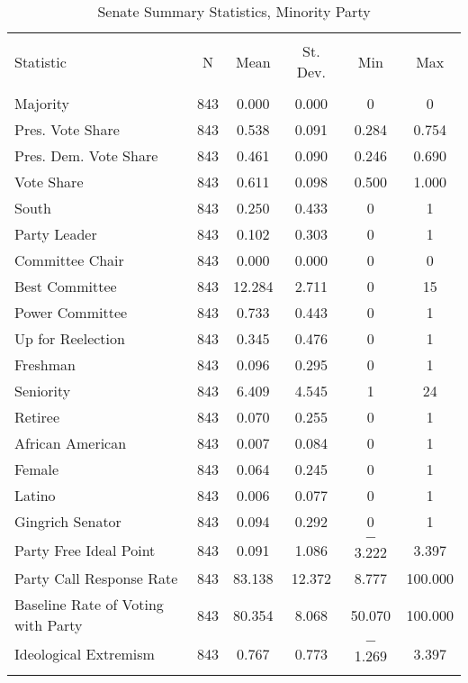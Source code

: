 \documentclass[12pt]{article}
\begin{document}
\begin{table}[!htbp] \centering 
	\caption{Senate Summary Statistics, Minority Party } 
	\label{} 
	\begin{tabular}{@{\extracolsep{5pt}}lccccc} 
		\\[-1.8ex]\hline 
		\hline \\[-1.8ex] 
		Statistic & \multicolumn{1}{c}{N} & \multicolumn{1}{c}{Mean} & \multicolumn{1}{c}{St. Dev.} & \multicolumn{1}{c}{Min} & \multicolumn{1}{c}{Max} \\ 
		\hline \\[-1.8ex] 
		Majority & 843 & 0.000 & 0.000 & 0 & 0 \\ 
		Pres. Vote Share & 843 & 0.538 & 0.091 & 0.284 & 0.754 \\ 
		Pres. Dem. Vote Share & 843 & 0.461 & 0.090 & 0.246 & 0.690 \\ 
		Vote Share & 843 & 0.611 & 0.098 & 0.500 & 1.000 \\ 
		South & 843 & 0.250 & 0.433 & 0 & 1 \\ 
		Party Leader & 843 & 0.102 & 0.303 & 0 & 1 \\ 
		Committee Chair & 843 & 0.000 & 0.000 & 0 & 0 \\ 
		Best Committee & 843 & 12.284 & 2.711 & 0 & 15 \\ 
		Power Committee & 843 & 0.733 & 0.443 & 0 & 1 \\ 
		Up for Reelection & 843 & 0.345 & 0.476 & 0 & 1 \\ 
		Freshman & 843 & 0.096 & 0.295 & 0 & 1 \\ 
		Seniority & 843 & 6.409 & 4.545 & 1 & 24 \\ 
		Retiree & 843 & 0.070 & 0.255 & 0 & 1 \\ 
		African American & 843 & 0.007 & 0.084 & 0 & 1 \\ 
		Female & 843 & 0.064 & 0.245 & 0 & 1 \\ 
		Latino & 843 & 0.006 & 0.077 & 0 & 1 \\ 
		Gingrich Senator & 843 & 0.094 & 0.292 & 0 & 1 \\ 
		Party Free Ideal Point & 843 & 0.091 & 1.086 & $-$3.222 & 3.397 \\ 
		Party Call Response Rate & 843 & 83.138 & 12.372 & 8.777 & 100.000 \\ 
		Baseline Rate of Voting with Party & 843 & 80.354 & 8.068 & 50.070 & 100.000 \\ 
		Ideological Extremism & 843 & 0.767 & 0.773 & $-$1.269 & 3.397 \\ 
		\hline \\[-1.8ex] 
	\end{tabular} 
\end{table} 
\end{document}
